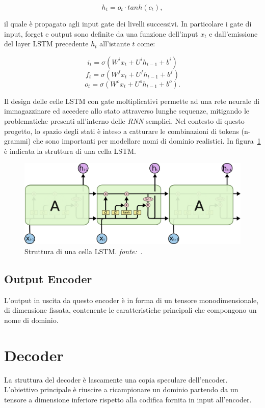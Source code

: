 \[h_t = o_t \cdot tanh(c_t),\]

il quale è propagato agli input gate dei livelli successivi. In particolare i gate di input, forget e output sono definite da una funzione dell'input $x_t$  e dall'emissione del layer LSTM precedente $h_t$ all'istante $t$ come:

\[i_t=\sigma\left(W^ix_t+U^ih_{t-1}+b^i\right)\]
\[f_t=\sigma\left(W^fx_t+U^fh_{t-1}+b^f\right)\]
\[o_t=\sigma\left(W^ox_t+U^oh_{t-1}+b^o\right).\]


Il design delle celle LSTM con gate moltiplicativi permette ad una rete neurale di immagazzinare ed accedere allo stato attraverso lunghe sequenze, mitigando le problematiche presenti all'interno delle \textit{RNN} semplici. Nel contesto di questo progetto, lo spazio degli stati è inteso a catturare le combinazioni di tokens (n-grammi) che sono importanti per modellare nomi di dominio realistici. In figura~\ref{fig:lstm} è indicata la struttura di una cella LSTM.

\begin{figure}[htb]
    \centering
	\includegraphics[width=\columnwidth]{figures/LSTM3-chain.png}
	\caption{Struttura di una cella LSTM. \textit{fonte:}~\cite{lstmblog}.
\label{fig:lstm}}
\end{figure}

\subsection{Output Encoder}
L'output in uscita da questo encoder è in forma di un tensore monodimensionale, di dimensione fissata, contenente le caratteristiche principali che compongono un nome di dominio.


\newpage
\section{Decoder}
\label{decoder}
La struttura del decoder è lascamente una copia speculare dell'encoder. L'obiettivo principale è riuscire a ricampionare un dominio partendo da un tensore a dimensione inferiore rispetto alla codifica fornita in input all'encoder.

